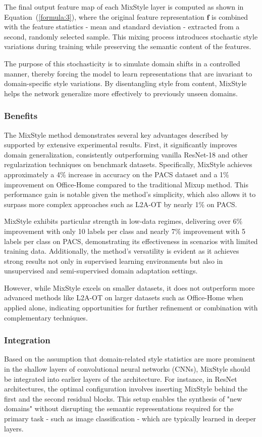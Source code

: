 The final output feature map of each MixStyle layer is computed as shown in Equation~(\ref{formula:3}), where the original feature representation $\mathbf{f}$ is combined with the feature statistics - mean and standard deviation - extracted from a second, randomly selected sample. This mixing process introduces stochastic style variations during training while preserving the semantic content of the features.

The purpose of this stochasticity is to simulate domain shifts in a controlled manner, thereby forcing the model to learn representations that are invariant to domain-specific style variations. By disentangling style from content, MixStyle helps the network generalize more effectively to previously unseen domains.

\subsubsection{Benefits}
The MixStyle method demonstrates several key advantages described by \cite{zhouMixStyleNeuralNetworks2023} supported by extensive experimental results. First, it significantly improves domain generalization, consistently outperforming vanilla ResNet-18 and other regularization techniques on benchmark datasets. Specifically, MixStyle achieves approximately a 4\% increase in accuracy on the PACS dataset and a 1\% improvement on Office-Home compared to the traditional Mixup method. This performance gain is notable given the method’s simplicity, which also allows it to surpass more complex approaches such as L2A-OT by nearly 1\% on PACS.

MixStyle exhibits particular strength in low-data regimes, delivering over 6\% improvement with only 10 labels per class and nearly 7\% improvement with 5 labels per class on PACS, demonstrating its effectiveness in scenarios with limited training data. Additionally, the method’s versatility is evident as it achieves strong results not only in supervised learning environments but also in unsupervised and semi-supervised domain adaptation settings.

However, while MixStyle excels on smaller datasets, it does not outperform more advanced methods like L2A-OT on larger datasets such as Office-Home when applied alone, indicating opportunities for further refinement or combination with complementary techniques.

\subsubsection{Integration}
Based on the assumption that domain-related style statistics are more prominent in the shallow layers of convolutional neural networks (CNNs), MixStyle should be integrated into earlier layers of the architecture. For instance, in ResNet architectures, the optimal configuration involves inserting MixStyle behind the first and the second residual blocks. This setup enables the synthesis of "new domains" without disrupting the semantic representations required for the primary task - such as image classification - which are typically learned in deeper layers.


